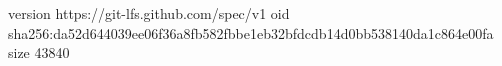 version https://git-lfs.github.com/spec/v1
oid sha256:da52d644039ee06f36a8fb582fbbe1eb32bfdcdb14d0bb538140da1c864e00fa
size 43840
